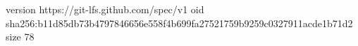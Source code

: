 version https://git-lfs.github.com/spec/v1
oid sha256:b11d85db73b4797846656e558f4b699fa27521759b9259c0327911acde1b71d2
size 78
